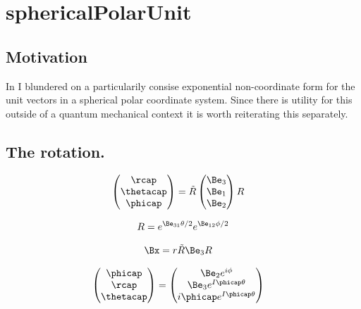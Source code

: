 

\chapter{sphericalPolarUnit}
\label{chap:sphericalPolarUnit}
{}
\date{Sept 20, 2009}

\beginArtNoToc

\section{Motivation}

In  I blundered on a particularily consise exponential non-coordinate form for the unit vectors in a spherical polar coordinate system.  Since there is utility for this outside of a quantum mechanical context it is worth reiterating this separately.

\section{The rotation.}

\begin{align}\label{eqn:qmSum:goo14}
\begin{pmatrix}
\rcap \\
\thetacap \\
\phicap \\
\end{pmatrix}
&=
\tilde{R}
\begin{pmatrix}
\Be_3 \\
\Be_1 \\
\Be_2 \\
\end{pmatrix}
R
\end{align}

\begin{align}\label{eqn:qmAngularMom:angExp1}
R = e^{\Be_{31}\theta/2} e^{\Be_{12}\phi/2}
\end{align}

\begin{align}\label{eqn:qmAngularMom:angExp2}
\Bx &= r \tilde{R} \Be_3 R 
\end{align}

\begin{align}\label{eqn:qmSum:goo15}
\begin{pmatrix}
\phicap \\
\rcap \\
\thetacap \\
\end{pmatrix}
&=
\begin{pmatrix}
\Be_2 e^{i\phi} \\
\Be_3 e^{I \phicap \theta} \\
i \phicap e^{I \phicap \theta} \\
\end{pmatrix}
\end{align}

\EndArticle
